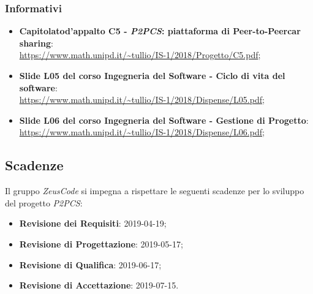 \subsubsection{Informativi}
\begin{itemize}
	\item \textbf{Capitolato\glosp d'appalto C5 - \textit{P2PCS}: piattaforma di Peer-to-Peer\glosp car sharing}: \\
	\url{https://www.math.unipd.it/~tullio/IS-1/2018/Progetto/C5.pdf};
	\item \textbf{Slide L05 del corso Ingegneria del Software - Ciclo di vita 
		del software}:\\
	\url{https://www.math.unipd.it/~tullio/IS-1/2018/Dispense/L05.pdf};
	\item \textbf{Slide L06 del corso Ingegneria del Software - Gestione di 
	Progetto}: \\
	\url{https://www.math.unipd.it/~tullio/IS-1/2018/Dispense/L06.pdf};
\end{itemize}

\hypertarget{scadenze}{\subsection{Scadenze}}
Il gruppo \textit{ZeusCode} si impegna a rispettare le seguenti scadenze per lo 
sviluppo del progetto \textit{P2PCS}:

\begin{itemize}
	\item \textbf{Revisione dei Requisiti}: 2019-04-19;
	\item \textbf{Revisione di Progettazione}: 2019-05-17;
	\item \textbf{Revisione di Qualifica}: 2019-06-17;
	\item \textbf{Revisione di Accettazione}: 2019-07-15.
\end{itemize}